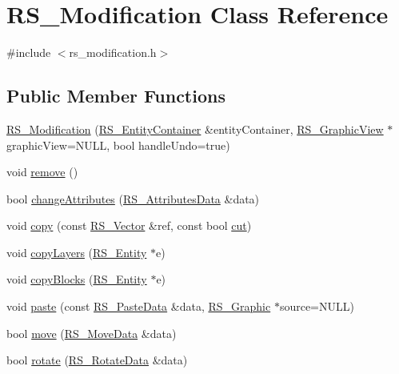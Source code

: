 \hypertarget{classRS__Modification}{\section{R\-S\-\_\-\-Modification Class Reference}
\label{classRS__Modification}
}


{\ttfamily \#include $<$rs\-\_\-modification.\-h$>$}

\subsection*{Public Member Functions}
\begin{DoxyCompactItemize}
\item 
\hyperlink{classRS__Modification_a13046c17a073d8c80f756ffc13cb40b9}{R\-S\-\_\-\-Modification} (\hyperlink{classRS__EntityContainer}{R\-S\-\_\-\-Entity\-Container} \&entity\-Container, \hyperlink{classRS__GraphicView}{R\-S\-\_\-\-Graphic\-View} $\ast$graphic\-View=N\-U\-L\-L, bool handle\-Undo=true)
\item 
void \hyperlink{classRS__Modification_af3c77f3e93dcd26d0b690a2d66eff8c4}{remove} ()
\item 
bool \hyperlink{classRS__Modification_a388b62deb8cc23c077b611e6d13499df}{change\-Attributes} (\hyperlink{classRS__AttributesData}{R\-S\-\_\-\-Attributes\-Data} \&data)
\item 
void \hyperlink{classRS__Modification_a9adf4fb32db186e32e4e22ea53cf7498}{copy} (const \hyperlink{classRS__Vector}{R\-S\-\_\-\-Vector} \&ref, const bool \hyperlink{classRS__Modification_a00801a57ee3f9f1c1b85e478ba5ae3dd}{cut})
\item 
void \hyperlink{classRS__Modification_a1ac4ab2d33d54cd3a30846dc4bb80095}{copy\-Layers} (\hyperlink{classRS__Entity}{R\-S\-\_\-\-Entity} $\ast$e)
\item 
void \hyperlink{classRS__Modification_af317e64cb6f378757caba8e927e1134d}{copy\-Blocks} (\hyperlink{classRS__Entity}{R\-S\-\_\-\-Entity} $\ast$e)
\item 
void \hyperlink{classRS__Modification_ac4fdb2b086f46afbdc2a9fe8cf645c8f}{paste} (const \hyperlink{classRS__PasteData}{R\-S\-\_\-\-Paste\-Data} \&data, \hyperlink{classRS__Graphic}{R\-S\-\_\-\-Graphic} $\ast$source=N\-U\-L\-L)
\item 
bool \hyperlink{classRS__Modification_a945f39993bdca439b83ca74b33f4506e}{move} (\hyperlink{classRS__MoveData}{R\-S\-\_\-\-Move\-Data} \&data)
\item 
bool \hyperlink{classRS__Modification_a59d6a9005815927ec6895425f154c30d}{rotate} (\hyperlink{classRS__RotateData}{R\-S\-\_\-\-Rotate\-Data} \&data)

\end{DoxyCompactItemize}
